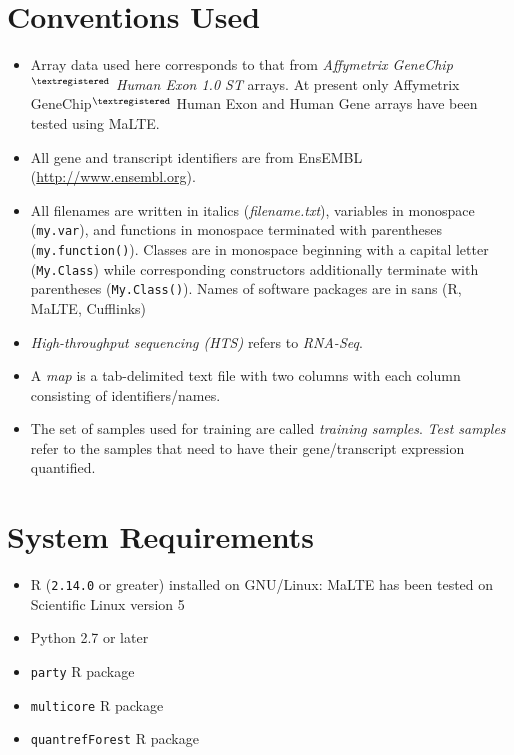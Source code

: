 \documentclass[a4paper,12pt]{article}
\begin{document}
\section{Conventions Used}
\label{conventions}
\begin{itemize}
\item Array data used here corresponds to that from \textit{Affymetrix GeneChip$^{\textregistered}$ Human Exon 1.0 ST} arrays. At present only Affymetrix GeneChip$^{\textregistered}$ Human Exon and Human Gene arrays have been tested using \textsf{MaLTE}.
\item All gene and transcript identifiers are from EnsEMBL (\url{http://www.ensembl.org}).
\item All filenames are written in italics (\textit{filename.txt}), variables in monospace (\texttt{my.var}), and functions in monospace terminated with parentheses (\texttt{my.function()}). Classes are in monospace beginning with a capital letter (\texttt{My.Class}) while corresponding constructors additionally terminate with parentheses (\texttt{My.Class()}). Names of software packages are in sans (\textsf{R}, \textsf{MaLTE}, \textsf{Cufflinks})
\item \textit{High-throughput sequencing (HTS)} refers to \textit{RNA-Seq}.
\item A \textit{map} is a tab-delimited text file with two columns with each column consisting of identifiers/names.
\item The set of samples used for training are called \textit{training samples}. \textit{Test samples} refer to the samples that need to have their gene/transcript expression quantified.
\end{itemize}

\section{System Requirements}
\label{system}
\begin{itemize}
\item \textsf{R} (\texttt{2.14.0} or greater) installed on GNU/Linux: \textsf{MaLTE} has been tested on Scientific Linux version 5
\item \textsf{Python} 2.7 or later
\item \texttt{party} \textsf{R} package
\item \texttt{multicore} \textsf{R} package
\item \texttt{quantrefForest} \textsf{R} package
\end{itemize}
\end{document}
